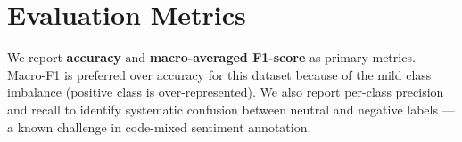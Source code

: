 \section{Evaluation Metrics}

We report \textbf{accuracy} and \textbf{macro-averaged F1-score} as primary metrics. Macro-F1 is preferred over accuracy for this dataset because of the mild class imbalance (positive class is over-represented). We also report per-class precision and recall to identify systematic confusion between neutral and negative labels — a known challenge in code-mixed sentiment annotation.


